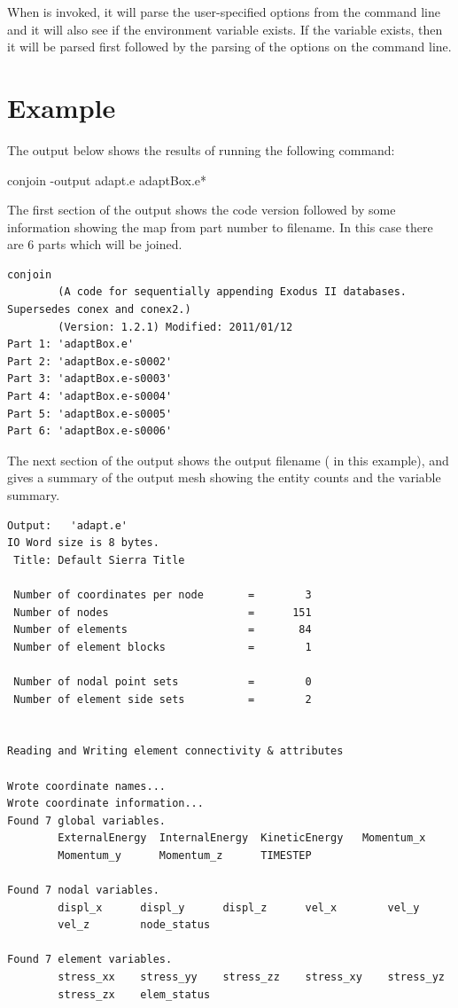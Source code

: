 When \conjoin{} is invoked, it will parse the user-specified options from
the command line and it will also see if the environment variable
 exists.  If the variable exists, then it will be
parsed first followed by the parsing of the options on the command line.

\section{Example}
The output below shows the results of running the following command:
\begin{syntax}
	conjoin -output adapt.e adaptBox.e*
\end{syntax}

The first section of the output shows the code version followed by some
information showing the map from part number to filename. In this case
there are 6 parts which will be joined.

\begin{verbatim}
conjoin
        (A code for sequentially appending Exodus II databases. Supersedes conex and conex2.)
        (Version: 1.2.1) Modified: 2011/01/12
Part 1: 'adaptBox.e'
Part 2: 'adaptBox.e-s0002'
Part 3: 'adaptBox.e-s0003'
Part 4: 'adaptBox.e-s0004'
Part 5: 'adaptBox.e-s0005'
Part 6: 'adaptBox.e-s0006'
\end{verbatim}
\sectionline
The next section of the output shows the output filename
( in this example), and gives a summary of the output
mesh showing the entity counts and the variable summary.
\begin{verbatim}
Output:   'adapt.e'
IO Word size is 8 bytes.
 Title: Default Sierra Title

 Number of coordinates per node       =        3
 Number of nodes                      =      151
 Number of elements                   =       84
 Number of element blocks             =        1

 Number of nodal point sets           =        0
 Number of element side sets          =        2


Reading and Writing element connectivity & attributes

Wrote coordinate names...
Wrote coordinate information...
Found 7 global variables.
        ExternalEnergy  InternalEnergy  KineticEnergy   Momentum_x
        Momentum_y      Momentum_z      TIMESTEP

Found 7 nodal variables.
        displ_x      displ_y      displ_z      vel_x        vel_y
        vel_z        node_status

Found 7 element variables.
        stress_xx    stress_yy    stress_zz    stress_xy    stress_yz
        stress_zx    elem_status
\end{verbatim}
\sectionline

